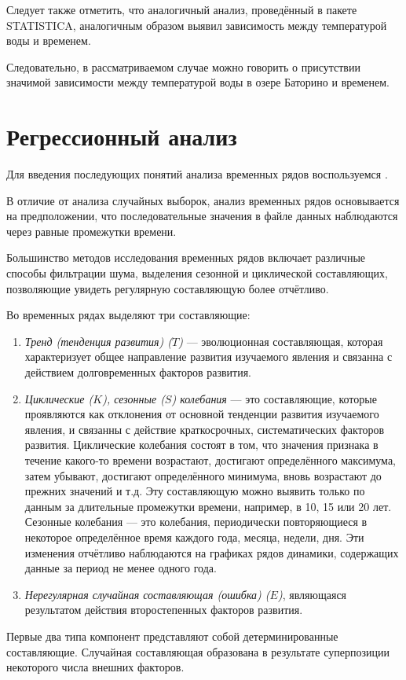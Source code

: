 Следует также отметить, что аналогичный анализ, проведённый в пакете STATISTICA, аналогичным образом выявил зависимость между температурой воды и временем.

Следовательно, в рассматриваемом случае можно говорить о присутствии значимой зависимости между температурой воды в озере Баторино и временем.


\section{Регрессионный анализ} %
\label{sec:regr_analysis}

Для введения последующих понятий анализа временных рядов воспользуемся \cite{Eddows1997}.

В отличие от анализа случайных выборок, анализ временных рядов основывается на предположении, что последовательные значения в файле данных наблюдаются через равные промежутки времени.

Большинство методов исследования временных рядов включает различные способы фильтрации шума, выделения сезонной и циклической составляющих, позволяющие увидеть регулярную составляющую более отчётливо.

Во временных рядах выделяют три составляющие:
\begin{enumerate}
	\item \textit{Тренд (тенденция развития) ($T$)} --- эволюционная составляющая, которая характеризует общее направление развития изучаемого явления и связанна с действием долговременных факторов развития.
	\item \textit{Циклические ($K$), сезонные ($S$) колебания} --- это составляющие, которые проявляются как отклонения от основной тенденции развития изучаемого явления, и связанны с действие краткосрочных, систематических факторов развития. Циклические колебания состоят в том, что значения признака в течение какого-то времени возрастают, достигают определённого максимума, затем убывают, достигают определённого минимума, вновь возрастают до прежних значений и т.д. Эту составляющую можно выявить только по данным за длительные промежутки времени, например, в 10, 15 или 20 лет. Сезонные колебания --- это колебания, периодически повторяющиеся в некоторое определённое время каждого года, месяца, недели, дня. Эти изменения отчётливо наблюдаются на графиках рядов динамики, содержащих данные за период не менее одного года.
	\item \textit{Нерегулярная случайная составляющая (ошибка) ($E$)}, являющаяся результатом действия второстепенных факторов развития.
\end{enumerate}
Первые два типа компонент представляют собой детерминированные составляющие. Случайная составляющая образована в результате суперпозиции некоторого числа внешних факторов.

